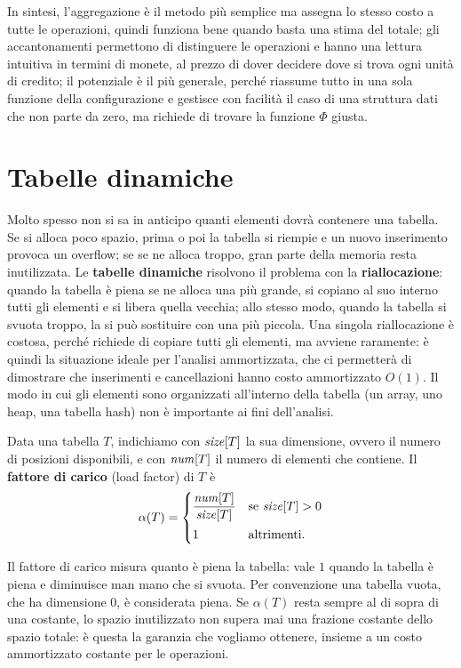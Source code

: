 In sintesi, l'aggregazione è il metodo più semplice ma assegna lo stesso costo a tutte le operazioni, quindi funziona bene quando basta una stima del totale; gli accantonamenti permettono di distinguere le operazioni e hanno una lettura intuitiva in termini di monete, al prezzo di dover decidere dove si trova ogni unità di credito; il potenziale è il più generale, perché riassume tutto in una sola funzione della configurazione e gestisce con facilità il caso di una struttura dati che non parte da zero, ma richiede di trovare la funzione $\Phi$ giusta.

\section{Tabelle dinamiche}\label{sec:tabelle}
Molto spesso non si sa in anticipo quanti elementi dovrà contenere una tabella. Se si alloca poco spazio, prima o poi la tabella si riempie e un nuovo inserimento provoca un overflow; se se ne alloca troppo, gran parte della memoria resta inutilizzata. Le \textbf{tabelle dinamiche} risolvono il problema con la \textbf{riallocazione}: quando la tabella è piena se ne alloca una più grande, si copiano al suo interno tutti gli elementi e si libera quella vecchia; allo stesso modo, quando la tabella si svuota troppo, la si può sostituire con una più piccola. Una singola riallocazione è costosa, perché richiede di copiare tutti gli elementi, ma avviene raramente: è quindi la situazione ideale per l'analisi ammortizzata, che ci permetterà di dimostrare che inserimenti e cancellazioni hanno costo ammortizzato $O(1)$. Il modo in cui gli elementi sono organizzati all'interno della tabella (un array, uno heap, una tabella hash) non è importante ai fini dell'analisi.

\begin{definizione}\label{def:carico}
Data una tabella $T$, indichiamo con $\mathit{size}[T]$ la sua dimensione, ovvero il numero di posizioni disponibili, e con $\mathit{num}[T]$ il numero di elementi che contiene. Il \textbf{fattore di carico} (load factor) di $T$ è
\[
\alpha(T) = \begin{cases} \dfrac{\mathit{num}[T]}{\mathit{size}[T]} & \text{se } \mathit{size}[T] > 0 \\[3mm] 1 & \text{altrimenti.} \end{cases}
\]
\end{definizione}

Il fattore di carico misura quanto è piena la tabella: vale $1$ quando la tabella è piena e diminuisce man mano che si svuota. Per convenzione una tabella vuota, che ha dimensione $0$, è considerata piena. Se $\alpha(T)$ resta sempre al di sopra di una costante, lo spazio inutilizzato non supera mai una frazione costante dello spazio totale: è questa la garanzia che vogliamo ottenere, insieme a un costo ammortizzato costante per le operazioni.

